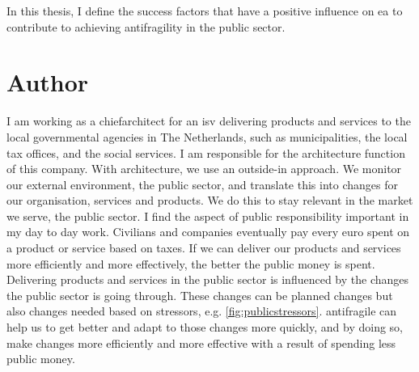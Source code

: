 In this thesis, I define the success factors that have a positive influence on \acrfull{ea} to contribute to achieving \gls{antifragility} in the public sector.
\section{Author}
\label{sec:author}
I am working as a \gls{chiefarchitect} for an \acrfull{isv} delivering products and services to the local governmental agencies in The Netherlands, such as municipalities, the local tax offices, and the social services. I am responsible for the architecture function of this company. With architecture, we use an outside-in approach. We monitor our external environment, the public sector, and translate this into changes for our organisation, services and products. We do this to stay relevant in the market we serve, the public sector. I find the aspect of public responsibility important in my day to day work. Civilians and companies eventually pay every euro spent on a product or service based on taxes. If we can deliver our products and services more efficiently and more effectively, the better the public money is spent. Delivering products and services in the public sector is influenced by the changes the public sector is going through. These changes can be planned changes but also changes needed based on \glspl{stressor}, e.g. \cref{fig:publicstressors}. \Gls{antifragile} can help us to get better and adapt to those changes more quickly, and by doing so, make changes more efficiently and more effective with a result of spending less public money.
